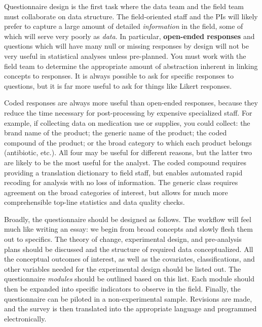 Questionnaire design
is the first task where the data team
and the field team must collaborate on data structure.
The field-oriented staff and the PIs will likely prefer
to capture a large amount of detailed \textit{information}
in the field, some of which will serve very poorly as \textit{data}.
In particular, \textbf{open-ended responses} and questions which will have
many null or missing responses by design will not be very useful
in statistical analyses unless pre-planned.
You must work with the field team to determine the appropriate amount
of abstraction inherent in linking concepts to responses.
It is always possible to ask for specific responses to questions,
but it is far more useful to ask for things like Likert responses.

Coded responses are always more useful than open-ended responses,
because they reduce the time necessary for post-processing by
expensive specialized staff.
For example, if collecting data on medication use or supplies,
you could collect: the brand name of the product;
the generic name of the product;
the coded compound of the product;
or the broad category to which each product belongs (antibiotic, etc.).
All four may be useful for different reasons,
but the latter two are likely to be the most useful for the analyst.
The coded compound requires providing a translation dictionary
to field staff, but enables automated rapid recoding for analysis
with no loss of information.
The generic class requires agreement on the broad categories of interest,
but allows for much more comprehensible top-line statistics and data quality checks.

Broadly, the questionnaire should be designed as follows.
The workflow will feel much like writing an essay:
we begin from broad concepts and slowly flesh them out to specifics.
The theory of change, experimental design, and pre-analysis plans should be discussed
and the structure of required data conceptualized.
All the conceptual outcomes of interest, as well as the covariates, classifications,
and other variables needed for the experimental design should be listed out.
The questionnaire \textit{modules} should be outlined based on this list.
Each module should then be expanded into specific indicators to observe in the field.
Finally, the questionnaire can be piloted in a non-experimental sample.
Revisions are made, and the survey is then translated into the appropriate language and programmed electronically.


